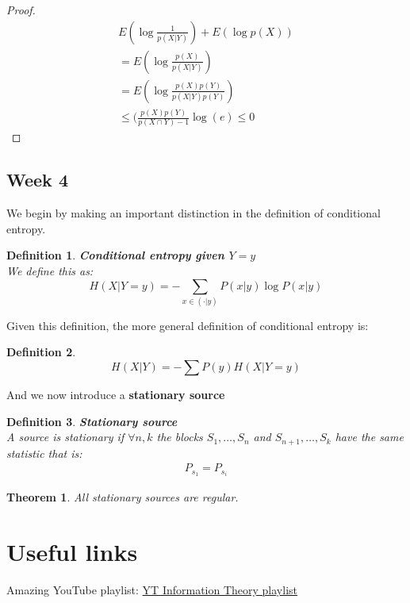 \documentclass[titlepage]{article}
\newtheorem{theorem}{Theorem}[section]
\newtheorem{definition}{Definition}
\begin{document}
\begin{proof}
\begin{align*}
    E(\log\frac{1}{p(X|Y)}) + E(\log p(X))\\
    = E(\log\frac{p(X)}{p(X|Y)})\\
    = E(\log\frac{p(X)p(Y)}{p(X|Y)p(Y)})\\
    \leq (\frac{p(X)p(Y)}{p(X\cap Y) - 1}\log(e)
    \leq 0
\end{align*}
\end{proof}

\subsection{Week 4}

We begin by making an important distinction in the definition of conditional entropy.

\begin{definition}\textbf{Conditional entropy given $Y=y$}
\\
We define this as:
$$H(X|Y=y) = - \sum_{x \in (\cdot | y)} P(x|y)\log P(x|y)$$
\end{definition}

Given this definition, the more general definition of conditional entropy is:

\begin{definition}
$$H(X|Y) = - \sum P(y)H(X|Y=y) $$
\end{definition}

And we now introduce a \textbf{stationary source}

\begin{definition}\textbf{Stationary source}
\\
A source is stationary if $\forall n,k$ the blocks $S_{1}, \ldots, S_{n}$ and $S_{n+1}, \ldots, S_{k}$ have the same statistic that is:
\begin{align*}
    P_{s_{1}} = P_{s_{i}}
\end{align*}

\end{definition}


\begin{theorem}
All stationary sources are regular. 
\end{theorem}


\section{Useful links}
Amazing YouTube playlist: \hyperlink{ https://www.youtube.com/playlist?list=PLE125425EC837021F}{YT Information Theory playlist}
\end{document}
